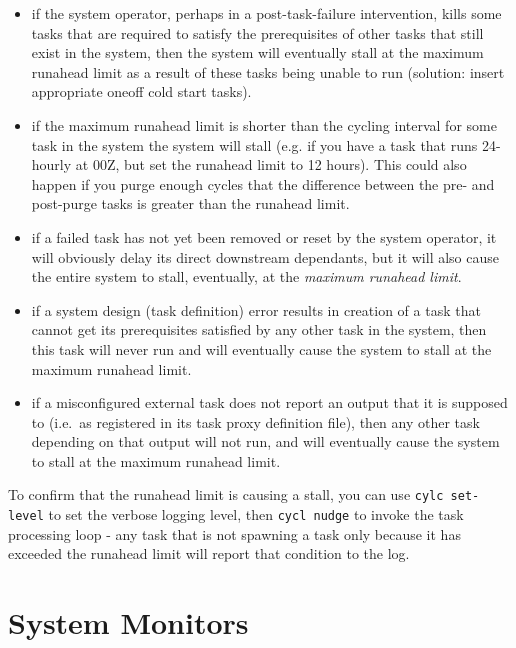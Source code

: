 \documentclass[11pt,a4paper]{article}
\begin{document}
\begin{itemize}
    \item if the system operator, perhaps in a post-task-failure
    intervention, kills some tasks that are required to satisfy the
    prerequisites of other tasks that still exist in the system, then 
    the system will eventually stall at the maximum runahead limit as a
    result of these tasks being unable to run (solution: insert
    appropriate oneoff cold start tasks).

    \item if the maximum runahead limit is shorter than the cycling
    interval for some task in the system the system will stall (e.g. if
    you have a task that runs 24-hourly at 00Z, but set the runahead
    limit to 12 hours). This could also happen if you purge enough
    cycles that the difference between the pre- and post-purge tasks
    is greater than the runahead limit.

    \item if a failed task has not yet been removed or reset by the
    system operator, it will obviously delay its direct downstream
    dependants, but it will also cause the entire system to stall,
    eventually, at the {\em maximum runahead limit}.  

    \item if a system design (task definition) error results in creation
    of a task that cannot get its prerequisites satisfied by any other
    task in the system, then this task will never run and will
    eventually cause the system to stall at the maximum runahead limit.

    \item if a misconfigured external task does not report an output
    that it is supposed to (i.e.\ as registered in its task proxy
    definition file), then any other task depending on that output will
    not run, and will eventually cause the system to stall at the
    maximum runahead limit.

\end{itemize}

To confirm that the runahead limit is causing a stall, you can use 
\lstinline=cylc set-level= to set the verbose logging level, then
\lstinline=cycl nudge= to invoke the task processing loop - any task
that is not spawning a task only because it has exceeded the runahead
limit will report that condition to the log.
\section{System Monitors}
\label{System Monitors}
\end{document}
